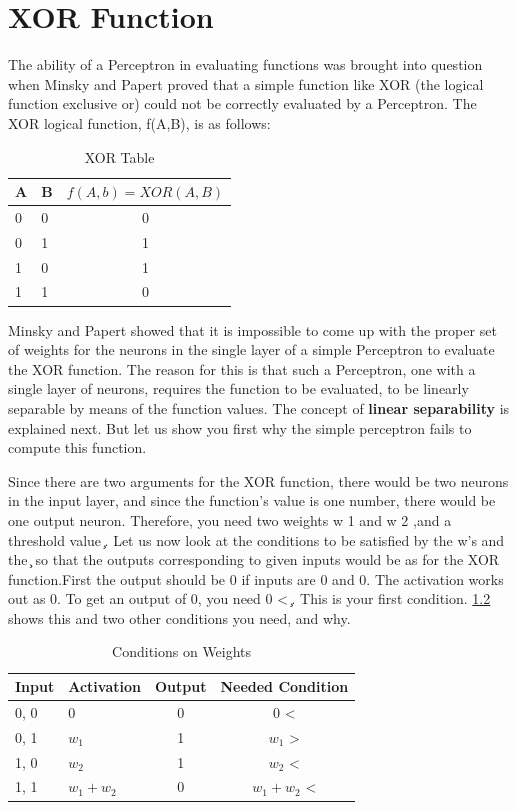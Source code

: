 \documentclass[12pt, right open]{memoir}
\begin{document}
\chapter{XOR Function}
The ability of a Perceptron in evaluating functions was brought into question
when Minsky and Papert proved that a simple function like XOR (the logical
function exclusive or) could not be correctly evaluated by a Perceptron. The
XOR logical function, f(A,B), is as follows: \\

\begin{table} 
\caption{XOR Table}
\label{tab:xor_table}
\begin{tabular}{|l|l|c|}
\hline
A & B & $f(A,b) = XOR(A,B)$ \\
\hline
0 & 0 & 0 \\ 
\hline
0 & 1 & 1 \\ 
\hline
1 & 0 & 1 \\ 
\hline
1 & 1 & 0 \\ 
\hline
\end{tabular}
\end{table}

Minsky and Papert showed that it is impossible to come up with the proper set of weights for the neurons in the single layer of a simple Perceptron to evaluate the XOR function. The reason for this is that such a Perceptron, one with a single layer of neurons, requires the function to be evaluated, to be linearly separable by means of the function values. The concept of \textbf{linear separability} is explained next. But let us show you first why the simple perceptron fails to compute this function.

Since there are two arguments for the XOR function, there would be two
neurons in the input layer, and since the function’s value is one number, there would be one output neuron. Therefore, you need two weights w 1 and w 2 ,and a threshold value  ̧. Let us now look at the conditions to be satisfied by the w’s and the  ̧ so that the outputs corresponding to given inputs would be as for the XOR function.First the output should be 0 if inputs are 0 and 0. The activation works out as 0. To get an output of 0, you need 0 <  ̧. This is your first condition. \ref{tab:conditions_on_weights} shows this and two other conditions you need, and why.

\begin{table} 
\caption{Conditions on Weights}
\label{tab:conditions_on_weights}
\begin{tabular}{|l|l|c|c|}
\hline
Input & Activation & Output & Needed Condition  \\
\hline
0, 0  & 0          & 0      & 0 <               \\ 
\hline
0, 1  & $w_1$      & 1      & $w_1$ >           \\ 
\hline
1, 0  & $w_2$      & 1      & $w_2$ <            \\ 
\hline
1, 1  & $w_1 + w_2$ & 0      & $w_1 + w_2$ <       \\ 
\hline
\end{tabular}
\end{table}
\end{document}
